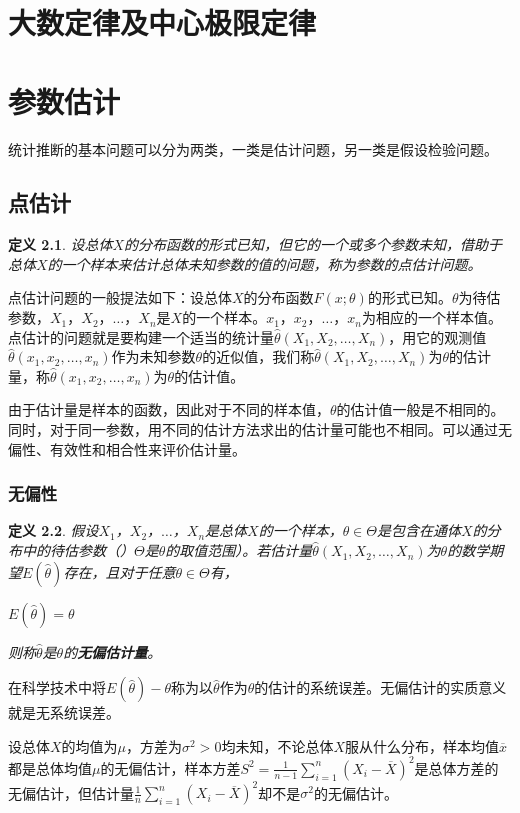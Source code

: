 \documentclass[11pt]{book}
\newtheorem{definition}{\hspace{2em}\textbf{定义}}
\begin{document}
	\chapter{大数定律及中心极限定律}
	\chapter{参数估计}
	统计推断的基本问题可以分为两类，一类是估计问题，另一类是假设检验问题。
	\section{点估计}
	\begin{definition}
		设总体$X$的分布函数的形式已知，但它的一个或多个参数未知，借助于总体$X$的一个样本来估计总体未知参数的值的问题，称为参数的点估计问题。
	\end{definition}
点估计问题的一般提法如下：设总体$X$的分布函数$F(x;\theta)$的形式已知。$\theta$为待估参数，$X_1$，$X_2$，$\dots$，$X_n$是$X$的一个样本。$x_1$，$x_2$，$\dots$，$x_n$为相应的一个样本值。点估计的问题就是要构建一个适当的统计量$\hat{\theta}(X_1,X_2,\dots,X_n)$，用它的观测值$\hat{\theta}(x_1,x_2,\dots,x_n)$作为未知参数$\theta$的近似值，我们称$\hat{\theta}(X_1,X_2,\dots,X_n)$为$\theta$的估计量，称$\hat{\theta}(x_1,x_2,\dots,x_n)$为$\theta$的估计值。

由于估计量是样本的函数，因此对于不同的样本值，$\theta$的估计值一般是不相同的。同时，对于同一参数，用不同的估计方法求出的估计量可能也不相同。可以通过无偏性、有效性和相合性来评价估计量。
\subsection{无偏性}
\begin{definition}
	假设$X_1$，$X_2$，$\dots$，$X_n$是总体$X$的一个样本，$\theta\in\Theta$是包含在通体$X$的分布中的待估参数（）$\Theta$是$\theta$的取值范围）。若估计量$\hat{\theta}(X_1,X_2,\dots,X_n)$为$\theta$的数学期望$E(\hat{\theta})$存在，且对于任意$\theta\in\Theta$有，
	\begin{center}
		$E(\hat{\theta})=\theta$
	\end{center}
则称$\hat{\theta}$是$\theta$的\textbf{无偏估计量}。
\end{definition}

在科学技术中将$E(\hat{\theta})-\theta$称为以$\hat{\theta}$作为$\theta$的估计的系统误差。无偏估计的实质意义就是无系统误差。

设总体$X$的均值为$\mu $，方差为$\sigma^2>0$均未知，不论总体$X$服从什么分布，样本均值$\overline{x}$都是总体均值$\mu $的无偏估计，样本方差$ S^2 =\frac{1}{n-1}\sum\limits_{i=1}^{n}(X_i-\overline{X})^2$是总体方差的无偏估计，但估计量$ \frac{1}{n}\sum\limits_{i=1}^{n}(X_i-\overline{X})^2$却不是$\sigma^2$的无偏估计。
\end{document}
